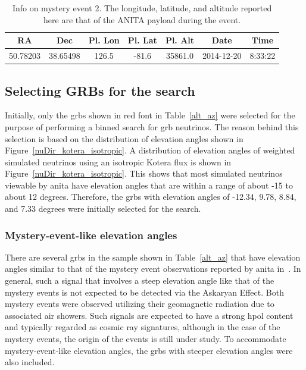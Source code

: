 \begin{table}
\centering
\begin{tabular}{ |c|c|c|c|c|c|c| } 
\hline
RA & Dec & Pl. Lon & Pl. Lat & Pl. Alt & Date & Time\\
\hline
50.78203 &	38.65498 &	126.5 &	-81.6 &	35861.0 &	
2014-12-20 & 8:33:22\\
\hline
\end{tabular}
\caption{Info on mystery event 2. The longitude, latitude, and altitude reported here are that of the ANITA payload during the event.}
\label{me2_verify}
\end{table}


\subsection{Selecting GRBs for the search}

Initially, only the \gls{grbs} shown in red font in Table~\ref{alt_az} were selected for the purpose of performing a binned search for \gls{grb} neutrinos. The reason behind this selection is based on the distribution of elevation angles shown in Figure~\ref{nuDir_kotera_isotropic}. A distribution of elevation angles of weighted simulated neutrinos using an isotropic Kotera flux is shown in Figure~\ref{nuDir_kotera_isotropic}. This shows that most simulated neutrinos viewable by \gls{anita} have elevation angles that are within a range of about -15 to about 12 degrees. Therefore, the \gls{grbs} with elevation angles of -12.34, 9.78, 8.84, and 7.33 degrees were initially selected for the search.

\subsubsection{Mystery-event-like elevation angles}

There are several \gls{grbs} in the sample shown in Table~\ref{alt_az} that have elevation angles similar to that of the mystery event observations reported by \gls{anita} in~\cite{me1,me2}. In general, such a signal that involves a steep elevation angle like that of the mystery events is not expected to be detected via the Askaryan Effect. Both mystery events were observed utilizing their geomagnetic radiation due to associated air showers. Such signals are expected to have a strong \gls{hpol} content and typically regarded as cosmic ray signatures, although in the case of the mystery events, the origin of the events is still under study. To accommodate mystery-event-like elevation angles, the \gls{grbs} with steeper elevation angles were also included. 

